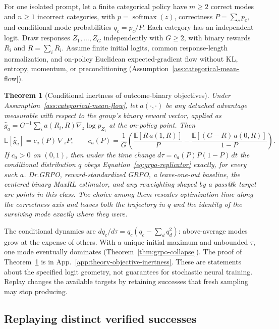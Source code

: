 \documentclass{article}
\newcommand{\1}{\mathbf 1}
\newcommand{\E}{\mathbb E}
\newtheorem{theorem}[lemma]{Theorem}
\theoremstyle{remark}
\theoremstyle{definition}
\theoremstyle{plain}
\begin{document}
For one isolated prompt, let a finite categorical policy have $m\ge2$ correct modes and $n\ge1$ incorrect categories, with $p=\operatorname{softmax}(z)$, correctness $P=\sum_c p_c$, and conditional mode probabilities $q_c=p_c/P$. Each category has an independent logit. Draw responses $Z_1,\ldots,Z_G$ independently with $G\ge2$, with binary rewards $R_i$ and $R=\sum_iR_i$. Assume finite initial logits, common response-length normalization, and on-policy Euclidean expected-gradient flow without KL, entropy, momentum, or preconditioning (Assumption~\ref{ass:categorical-mean-flow}).

\begin{theorem}[Conditional inertness of outcome-binary objectives]
\label{thm:objective-inertness}
Under Assumption~\ref{ass:categorical-mean-flow}, let $a(\cdot,\cdot)$ be any
detached advantage measurable with respect to the group's binary reward
vector, applied as
$\widehat g_a=G^{-1}\sum_{i}a(R_i,R)\nabla_z\log p_{Z_i}$ at the on-policy
point. Then
\begin{equation}
  \E[\widehat g_a]=c_a(P)\,\nabla_zP,
  \qquad
  c_a(P)=\frac1G\left(
  \frac{\E[R\,a(1,R)]}{P}-\frac{\E[(G-R)\,a(0,R)]}{1-P}\right).
  \label{eq:objective-inertness}
\end{equation}
If $c_a>0$ on $(0,1)$, then under the time change
$d\tau=c_a(P)P(1-P)\,dt$ the conditional distribution $q$ obeys
Equation~\eqref{eq:grpo-replicator} exactly, for every such $a$. Dr.GRPO,
reward-standardized GRPO, a leave-one-out baseline, the centered binary MaxRL
estimator, and any reweighting shaped by a pass@$k$ target are points in this
class. The choice among them rescales optimization time along the correctness
axis and leaves both the trajectory in $q$ and the identity of the surviving
mode exactly where they were.
\end{theorem}

The conditional dynamics are $dq_c/d\tau=q_c(q_c-\sum_dq_d^2)$: above-average modes grow at the expense of others. With a unique initial maximum and unbounded $\tau$, one mode eventually dominates (Theorem~\ref{thm:grpo-collapse}). The proof of Theorem~\ref{thm:objective-inertness} is in App.~\ref{app:theory-objective-inertness}. These are statements about the specified logit geometry, not guarantees for stochastic neural training. Replay changes the available targets by retaining successes that fresh sampling may stop producing.

\subsection{Replaying distinct verified successes}
\label{sec:replay}
\end{document}
